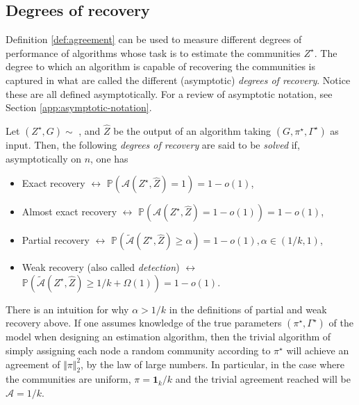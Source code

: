 \documentclass[../../main.tex]{subfiles} %
\begin{document}
\subsection{Degrees of recovery}
Definition \ref{def:agreement} can be used to measure different degrees of 
performance of algorithms whose task is to estimate the communities 
\(Z^\star\). The degree to which an algorithm is capable of recovering the 
communities is captured in what are called the different (asymptotic) 
\textit{degrees of recovery}. Notice these are all defined asymptotically. For a 
review of asymptotic notation, see Section \ref{app:asymptotic-notation}.
\begin{definition}
	Let \((Z^\star, G) \sim\) , and \(\hat Z\) 
	be the 
	output of an algorithm taking \((G, \pi^\star, \Gamma^\star)\) as input. 
	Then, the following \textit{degrees of recovery} are said to be 
	\textit{solved} if, asymptotically on \(n\), one has
	\begin{itemize}
		\item Exact recovery \(\leftrightarrow\) 
		\(\mathbb P (\mathcal{A}(Z^\star, \hat 
		Z) = 1) = 1 - o(1)\),
		\item Almost exact recovery 
		\(\leftrightarrow\) \(\mathbb P 
		(\mathcal{A}(Z^\star, 
		\hat Z) = 1 - o(1)) = 1 - o(1)\), 
		\item Partial recovery \(\leftrightarrow\) \(\mathbb P 
		(\tilde{\mathcal{A}}(Z^\star, \hat 
		Z) \geq \alpha) = 1 - o(1), \alpha \in (1/k, 1)\),
		\item Weak recovery (also called \textit{detection}) \(\leftrightarrow\) 
		\(\mathbb P (\tilde{\mathcal{A}} (Z^\star, 
		\hat 
		Z) \geq 1/k + \Omega(1)) = 1 - o(1)\).
	\end{itemize}
\end{definition}

\begin{remark}
	There is an intuition for why \(\alpha > 1/k\) in the definitions of 
	partial and weak recovery above. If one assumes knowledge of the true 
	parameters \((\pi^\star, \Gamma^\star)\) of the model when designing an 
	estimation algorithm, then the trivial algorithm of simply assigning each 
	node a random community according to \(\pi^\star\) will achieve an 
	agreement of \(\Vert \pi \Vert_2^2\), by the law of large numbers. In 
	particular, in the case where the communities are uniform, \(\pi = 
	\mathbf{1}_k / k\) and the trivial agreement reached will be \(\mathcal A = 
	1/k\).
\end{remark}
\end{document}
